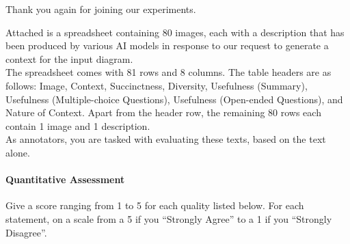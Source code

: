 \centering
\begin{tcolorbox}[
    colback=white,
    colframe=gray!20,
    arc=10pt,
    boxrule=1pt,
    title={\textcolor{white}{\textbf{Evaluation Guidelines for the \textcolor{Yellow}{BLV Educator} Group}}},
    coltitle=white,
    fonttitle=\large,
    colbacktitle=black!70,
]

Thank you again for joining our experiments.

Attached is a spreadsheet containing 80 images, each with a description that has been produced by various AI models in response to our request to generate a context for the input diagram.\\

The spreadsheet comes with 81 rows and 8 columns. The table headers are as follows: Image, Context, Succinctness, Diversity, Usefulness (Summary), Usefulness (Multiple-choice Questions), Usefulness (Open-ended Questions), and Nature of Context. Apart from the header row, the remaining 80 rows each contain 1 image and 1 description.\\

As annotators, you are tasked with evaluating these texts, based on the text alone.

\paragraph{Quantitative Assessment}

Give a score ranging from 1 to 5 for each quality listed below. For each statement, on a scale from a 5 if you ``Strongly Agree'' to a 1 if you ``Strongly Disagree''.


\end{tcolorbox}
